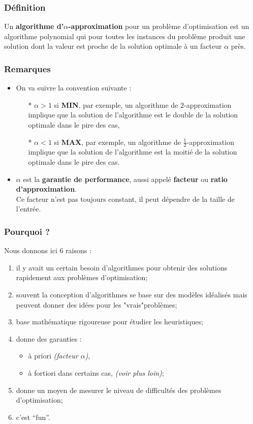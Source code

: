 \documentclass{article}
\begin{document}
\begin{sffamily}
\subsubsection*{Définition}
Un \textbf{algorithme d'$\alpha$-approximation} pour un problème d'optimisation
est un algorithme polynomial qui \indent pour toutes les instances du problème
produit une solution dont la valeur est proche de la solution optimale \indent
à un facteur $\alpha$ près.

\subsubsection*{Remarques}
\begin{itemize}
\item On va suivre la convention suivante :
\begin{itemize}
\item[*]$\boxed{\alpha > 1}$ si \textbf{MIN}, par exemple, un algorithme de
$2$-approximation implique que la solution de l'algorithme est le double de
la solution optimale dans le pire des cas,
\item[*]$\boxed{\alpha < 1}$ si \textbf{MAX}, par exemple, un algorithme de
$\frac{1}{2}$-approximation implique que la solution de l'algorithme est la
moitié de la solution optimale dans le pire des cas.
\end{itemize}
\item $\alpha$ est la \textbf{garantie de performance}, aussi appelé
\textbf{facteur} ou \textbf{ratio d'approximation}.\\
Ce facteur n'est pas toujours constant, il peut dépendre de la taille de
l'entrée.
\end{itemize}

\subsubsection*{Pourquoi ?}
Nous donnons ici 6 raisons :
\begin{enumerate}
\item il y avait un certain besoin d'algorithmes pour obtenir des solutions
rapidement aux problèmes d'optimisation;
\item souvent la conception d'algorithmes se base sur des modèles idéalisés mais
peuvent donner des idées pour les "vrais"problèmes;
\item base mathématique rigoureuse pour étudier les heuristiques;
\item donne des garanties :
\begin{itemize}
\item à priori \textit{(facteur $\alpha$)},
\item à fortiori dans certains cas, \textit{(voir plus loin)};
\end{itemize}
\item donne un moyen de mesurer le niveau de difficultés des problèmes
d'optimisation;
\item c'est ``fun''.
\end{enumerate}


\end{sffamily}
\end{document}
